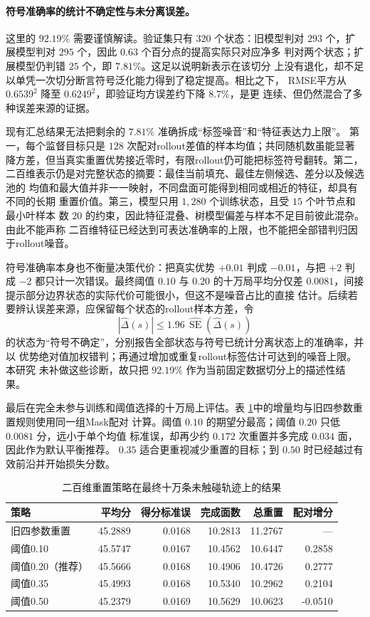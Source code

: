 \documentclass[UTF8,11pt,openany]{ctexrep}
\begin{document}
\paragraph{符号准确率的统计不确定性与未分离误差。}
这里的 $92.19\%$ 需要谨慎解读。验证集只有 $320$ 个状态：旧模型判对
$293$ 个，扩展模型判对 $295$ 个，因此 $0.63$ 个百分点的提高实际只对应净多
判对两个状态；扩展模型仍判错 $25$ 个，即 $7.81\%$。这足以说明新表示在该切分
上没有退化，却不足以单凭一次切分断言符号泛化能力得到了稳定提高。相比之下，
RMSE平方从 $0.6539^2$ 降至 $0.6249^2$，即验证均方误差约下降 $8.7\%$，是更
连续、但仍然混合了多种误差来源的证据。

现有汇总结果无法把剩余的 $7.81\%$ 准确拆成“标签噪音”和“特征表达力上限”。
第一，每个监督目标只是 $128$ 次配对rollout差值的样本均值；共同随机数虽能显著
降方差，但当真实重置优势接近零时，有限rollout仍可能把标签符号翻转。第二，
二百维表示仍是对完整状态的摘要：最佳当前填充、最佳左侧候选、差分以及候选池的
均值和最大值并非一一映射，不同盘面可能得到相同或相近的特征，却具有不同的长期
重置价值。第三，模型只用 $1{,}280$ 个训练状态，且受 $15$ 个叶节点和最小叶样本
数 $20$ 的约束，因此特征混叠、树模型偏差与样本不足目前彼此混杂。由此不能声称
二百维特征已经达到可表达准确率的上限，也不能把全部错判归因于rollout噪音。

符号准确率本身也不衡量决策代价：把真实优势 $+0.01$ 判成 $-0.01$，与把
$+2$ 判成 $-2$ 都只计一次错误。最终阈值 $0.10$ 与 $0.20$ 的十万局平均分仅差
$0.0081$，间接提示部分边界状态的实际代价可能很小，但这不是噪音占比的直接
估计。后续若要辨认误差来源，应保留每个状态的rollout样本方差，令
\[
\left|\widehat{\Delta}(s)\right|
\leq 1.96\,\widehat{\operatorname{SE}}\!\left(\widehat{\Delta}(s)\right)
\]
的状态为“符号不确定”，分别报告全部状态与符号已统计分离状态上的准确率，并以
优势绝对值加权错判；再通过增加或重复rollout标签估计可达到的噪音上限。本研究
未补做这些诊断，故只把 $92.19\%$ 作为当前固定数据切分上的描述性结果。

最后在完全未参与训练和阈值选择的十万局上评估。表
\ref{tab:expanded-reset-final}中的增量均与旧四参数重置规则使用同一组Mask配对
计算。阈值 $0.10$ 的期望分最高；阈值 $0.20$ 只低 $0.0081$ 分，远小于单个均值
标准误，却再少约 $0.172$ 次重置并多完成 $0.034$ 面，因此作为默认平衡推荐。
$0.35$ 适合更重视减少重置的目标；到 $0.50$ 时已经越过有效前沿并开始损失分数。

\begin{table}[htbp]
\centering
\caption{二百维重置策略在最终十万条未触碰轨迹上的结果}
\label{tab:expanded-reset-final}
\begin{tabular}{lrrrrr}
\toprule
策略 & 平均分 & 得分标准误 & 完成面数 & 总重置 & 配对增分 \\
\midrule
旧四参数重置 & 45.2889 & 0.0168 & 10.2813 & 11.2767 & --- \\
阈值0.10 & 45.5747 & 0.0167 & 10.4562 & 10.6447 & 0.2858 \\
阈值0.20（推荐） & 45.5666 & 0.0168 & 10.4906 & 10.4726 & 0.2777 \\
阈值0.35 & 45.4993 & 0.0168 & 10.5340 & 10.2962 & 0.2104 \\
阈值0.50 & 45.2379 & 0.0169 & 10.5629 & 10.0623 & -0.0510 \\
\bottomrule
\end{tabular}
\end{table}
\end{document}
